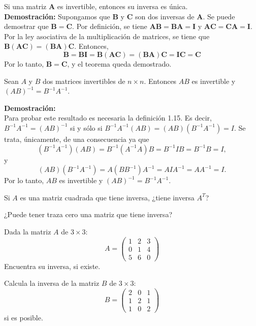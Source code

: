 \begin{}
\begin{tcolorbox}[colback=white!5!white,colframe=red!50!red,title=Teorema]
Si una matriz $\boldsymbol{A}$ es invertible, entonces su inversa es única.\\
\textbf{Demostración:} Supongamos que $\boldsymbol{B}$ y $\boldsymbol{C}$ son dos inversas de $\boldsymbol{A}$. Se puede demostrar que $\boldsymbol{B} = \boldsymbol{C}$. Por definición, se tiene $\boldsymbol{AB} = \boldsymbol{BA} = \boldsymbol{I}$ y $\boldsymbol{AC} =\boldsymbol{ CA} = \boldsymbol{I}$. Por la ley asociativa de la multiplicación de matrices, se tiene que $\boldsymbol{B}(\boldsymbol{AC}) = (\boldsymbol{BA})\boldsymbol{C}$. Entonces,
\[ \boldsymbol{B} = \boldsymbol{BI} = \boldsymbol{B(AC)} = \boldsymbol{(BA)C} = \boldsymbol{IC} = \boldsymbol{C} \]
Por lo tanto, $\boldsymbol{B} = \boldsymbol{C}$, y el teorema queda demostrado. 
\end{tcolorbox}
\begin{tcolorbox}[colback=white!5!white,colframe=red!50!red,title=Teorema]
Sean $A$ y $B$ dos matrices invertibles de $n \times n$. Entonces $AB$ es invertible y 
$(AB)^{-1} = B^{-1} A^{-1}$.

\textbf{Demostración:}\\
Para probar este resultado es necesaria la definición 1.15. Es decir, $B^{-1} A^{-1} = (AB)^{-1}$ si 
y sólo si $B^{-1} A^{-1} (AB) = (AB) (B^{-1} A^{-1}) = I$. Se trata, únicamente, de una consecuencia 
ya que
\[
(B^{-1} A^{-1})(AB) = B^{-1}(A^{-1}A)B = B^{-1}IB = B^{-1}B = I,
\]
y
\[
(AB)(B^{-1} A^{-1}) = A(BB^{-1})A^{-1} = AIA^{-1} = AA^{-1} = I.
\]
Por lo tanto, $AB$ es invertible y $(AB)^{-1} = B^{-1} A^{-1}$.
 \end{tcolorbox}
\begin{exercise}
Si $A$ es una matriz cuadrada que tiene inversa,  ¿tiene inversa $A^T$?  
\end{exercise}
\begin{exercise}
¿Puede tener traza cero una matriz que tiene inversa?
\end{exercise}
\begin{exercise}
    Dada la matriz $A$ de $3 \times 3$:
\[
A = \begin{pmatrix} 
1 & 2 & 3 \\
0 & 1 & 4 \\
5 & 6 & 0 
\end{pmatrix}
\]
Encuentra su inversa, si existe.

\end{exercise}
\begin{exercise}
 Calcula la inversa de la matriz $B$ de $3 \times 3$:
\[
B = \begin{pmatrix} 
2 & 0 & 1 \\
1 & 2 & 1 \\
1 & 0 & 2 
\end{pmatrix}
\]
si es posible.
   

\end{exercise}
\end{}
